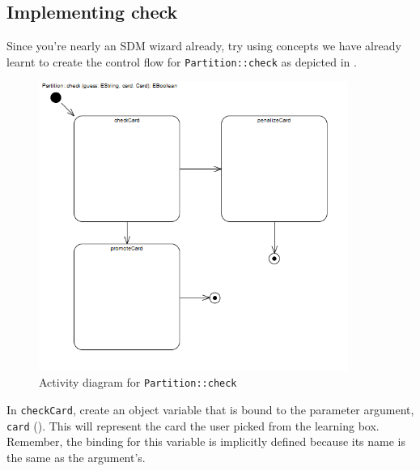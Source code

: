 \newpage
\hypertarget{checkCard vis}{}
\subsection{Implementing check}
\label{sec: Implementing check}
\genHeader

\begin{stepbystep}

\vspace{1cm}

\item Since you're nearly an SDM wizard already, try using concepts we have already learnt to create the control flow for
\texttt{Partition::check} as depicted in .

\vspace{1cm}

\begin{figure}[htbp]
\begin{center}
  \includegraphics[width=0.9\textwidth]{../../org.moflon.doc.handbook.03_storyDiagrams/04_checkCard/visCheImages/ea_activityCheck}
  \caption{Activity diagram for \texttt{Partition::check}}
  \label{ea:sdm_check_start}
\end{center}
\end{figure}

\vspace{1cm}

\item In \texttt{checkCard}, create an object variable that is bound to the parameter argument, \texttt{card} 
(). This will represent the card the user picked from the learning box. Remember, the binding for this variable is implicitly
defined because its name is the same as the argument's.


\end{stepbystep}

